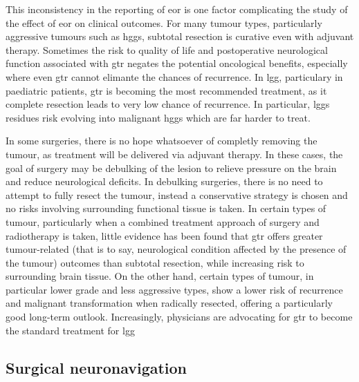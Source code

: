 This inconsistency in the reporting of \gls{eor} is one factor complicating the study of the effect of \gls{eor} on clinical outcomes.
For many tumour types, particularly aggressive tumours such as \glspl{hgg}, subtotal resection is  curative even with adjuvant therapy.
Sometimes the risk to quality of life and postoperative neurological function associated with \gls{gtr} negates the potential oncological benefits, especially where even \gls{gtr} cannot elimante the chances of recurrence.
In \gls{lgg}, particulary in paediatric patients, \gls{gtr} is becoming the most recommended treatment, as it complete resection leads to very low chance of recurrence.
In particular, \glspl{lgg} residues risk evolving into malignant \glspl{hgg} which are far harder to treat.

In some surgeries, there is no hope whatsoever of completly removing the tumour, as treatment will be delivered via adjuvant therapy.
In these cases, the goal of surgery may be debulking of the lesion to relieve pressure on the brain and reduce neurological deficits.
In debulking surgeries, there is no need to attempt to fully resect the tumour, instead a conservative strategy is chosen and no risks involving surrounding functional tissue is taken.
In certain types of tumour, particularly when a combined treatment approach of surgery and radiotherapy is taken, little evidence has been found that \gls{gtr} offers greater tumour-related (that is to say, neurological condition affected by the presence of the tumour) outcomes than subtotal resection, while increasing risk to surrounding brain tissue.
On the other hand, certain types of tumour, in particular lower grade and less aggressive types, show a lower risk of recurrence and malignant transformation when radically resected, offering a particularly good long-term outlook.
Increasingly, physicians are advocating for \gls{gtr} to become the standard treatment for \gls{lgg} 


\subsection{Surgical neuronavigation}



